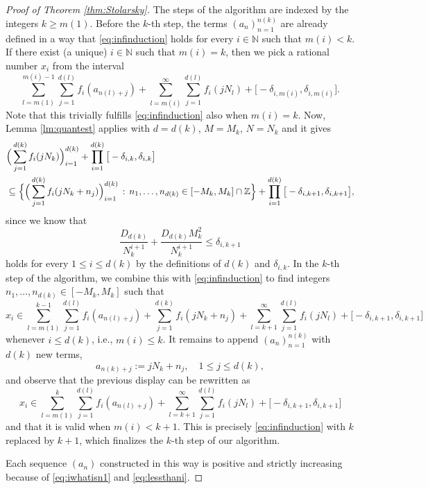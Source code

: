 \documentclass[11pt,letterpaper,reqno]{amsart}
\numberwithin{equation}{section}
\theoremstyle{definition}
\numberwithin{equation}{section}
\begin{document}
\begin{proof}[Proof of Theorem \ref{thm:Stolarsky}]
The steps of the algorithm are indexed by the integers $k\geqslant m(1)$.
Before the $k$-th step, the terms $(a_n)_{n=1}^{n(k)}$ are already defined in a way that \eqref{eq:infinduction} holds for every $i\in\mathbb{N}$ such that $m(i)<k$.
If there exist (a unique) $i\in\mathbb{N}$ such that $m(i)=k$, then we pick a rational number $x_i$ from the interval
\[ \sum_{l=m(1)}^{m(i)-1} \sum_{j=1}^{d(l)} f_i(a_{n(l)+j}) + \sum_{l=m(i)}^{\infty} \sum_{j=1}^{d(l)} f_i(j N_l) + \big[-\delta_{i,m(i)},\delta_{i,m(i)}\big]. \]
Note that this trivially fulfills \eqref{eq:infinduction} also when $m(i)=k$.
Now, Lemma \ref{lm:quantest} applies with $d=d(k)$, $M=M_k$, $N=N_k$ and it gives
\begin{align*}
& \Big( \sum_{j=1}^{d(k)} f_i(j N_k) \Big)_{i=1}^{d(k)} + \prod_{i=1}^{d(k)} \big[-\delta_{i,k},\delta_{i,k}\big] \\
& \subseteq \Bigl\{ \Big( \sum_{j=1}^{d(k)} f_i(j N_k + n_j) \Big)_{i=1}^{d(k)} \,:\, n_1,\ldots,n_{d(k)}\in[-M_k,M_k]\cap\mathbb{Z} \Bigr\} + \prod_{i=1}^{d(k)} \big[-\delta_{i,k+1},\delta_{i,k+1}\big],
\end{align*}
since we know that
\[ \frac{D_{d(k)}}{N_{k}^{i+1}} + \frac{D_{d(k)}M_k^2}{N_{k}^{i+1}} \leqslant \delta_{i,k+1} \]
holds for every $1\leqslant i\leqslant d(k)$ by the definitions of $d(k)$ and $\delta_{i,k}$.
In the $k$-th step of the algorithm, we combine this with \eqref{eq:infinduction} to find integers $n_1,\ldots,n_{d(k)}\in[-M_k,M_k]$ such that
\[ x_i \in \sum_{l=m(1)}^{k-1} \sum_{j=1}^{d(l)} f_i(a_{n(l)+j}) + \sum_{j=1}^{d(k)} f_i(j N_k + n_j) + \sum_{l=k+1}^{\infty} \sum_{j=1}^{d(l)} f_i(j N_l) + \big[-\delta_{i,k+1},\delta_{i,k+1}\big] \]
whenever $i\leqslant d(k)$, i.e., $m(i)\leqslant k$.
It remains to append $(a_n)_{n=1}^{n(k)}$ with $d(k)$ new terms,
\[ a_{n(k)+j} := j N_k + n_j, \quad 1\leqslant j\leqslant d(k), \]
and observe that the previous display can be rewritten as
\[ x_i \in \sum_{l=m(1)}^{k} \sum_{j=1}^{d(l)} f_i(a_{n(l)+j}) + \sum_{l=k+1}^{\infty} \sum_{j=1}^{d(l)} f_i(j N_l) + \big[-\delta_{i,k+1},\delta_{i,k+1}\big] \]
and that it is valid when $m(i)<k+1$.
This is precisely \eqref{eq:infinduction} with $k$ replaced by $k+1$, which finalizes the $k$-th step of our algorithm.

Each sequence $(a_n)$ constructed in this way is positive and strictly increasing because of \eqref{eq:iwhatisn1} and \eqref{eq:lessthani}.
\end{proof}

\end{document}
